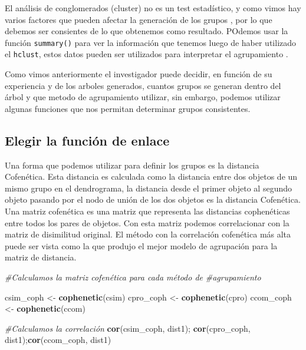 \documentclass[]{book}
\newenvironment{Shaded}{\begin{snugshade}}{\end{snugshade}}
\newcommand{\KeywordTok}[1]{\textcolor[rgb]{0.13,0.29,0.53}{\textbf{{#1}}}}
\newcommand{\StringTok}[1]{\textcolor[rgb]{0.31,0.60,0.02}{{#1}}}
\newcommand{\CommentTok}[1]{\textcolor[rgb]{0.56,0.35,0.01}{\textit{{#1}}}}
\newcommand{\NormalTok}[1]{{#1}}
\begin{document}
El análisis de conglomerados (cluster) no es un test estadístico, y como
vimos hay varios factores que pueden afectar la generación de los grupos
\citep{Borcard2011}, por lo que debemos ser consientes de lo que
obtenemos como resultado. POdemos usar la función \texttt{summary()}
para ver la información que tenemos luego de haber utilizado el
\texttt{hclust}, estos datos pueden ser utilizados para interpretar el
agrupamiento \citep{Borcard2011}.

Como vimos anteriormente el investigador puede decidir, en función de su
experiencia y de los arboles generados, cuantos grupos se generan dentro
del árbol y que metodo de agrupamiento utilizar, sin embargo, podemos
utilizar algunas funciones que nos permitan determinar grupos
consistentes.

\subsection{Elegir la función de
enlace}\label{elegir-la-funcion-de-enlace}

Una forma que podemos utilizar para definir los grupos es la distancia
Cofenética. Esta distancia es calculada como la distancia entre dos
objetos de un mismo grupo en el dendrograma, la distancia desde el
primer objeto al segundo objeto pasando por el nodo de unión de los dos
objetos es la distancia Cofenética. Una matriz cofenética es una matriz
que representa las distancias cophenéticas entre todos los pares de
objetos. Con esta matriz podemos correlacionar con la matriz de
disimilitud original. El método con la correlación cofenética más alta
puede ser vista como la que produjo el mejor modelo de agrupación para
la matriz de distancia.

\begin{Shaded}
\begin{Highlighting}[]
\CommentTok{#Calculamos la matriz cofenética para cada método de}
\CommentTok{#agrupamiento}

\NormalTok{csim_coph <-}\StringTok{ }\KeywordTok{cophenetic}\NormalTok{(csim)}
\NormalTok{cpro_coph <-}\StringTok{ }\KeywordTok{cophenetic}\NormalTok{(cpro)}
\NormalTok{ccom_coph <-}\StringTok{ }\KeywordTok{cophenetic}\NormalTok{(ccom)}

\CommentTok{#Calculamos la correlación}
\KeywordTok{cor}\NormalTok{(csim_coph, dist1); }\KeywordTok{cor}\NormalTok{(cpro_coph, dist1);}\KeywordTok{cor}\NormalTok{(ccom_coph, dist1)}
\end{Highlighting}
\end{Shaded}
\end{document}
